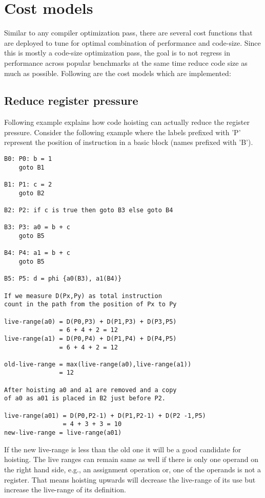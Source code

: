 \documentclass{sig-alternate}
\begin{document}
\section{Cost models}
\label{sec:cost-models}
Similar to any compiler optimization pass, there are several cost functions that
are deployed to tune for optimal combination of performance and code-size.
Since this is mostly a code-size optimization pass, the goal is to not regress
in performance across popular benchmarks at the same time reduce code size as
much as possible. Following are the cost models which are implemented:

\subsection{Reduce register pressure}
\label{hoist:reg-pressure}
Following example explains how code hoisting can actually reduce the register
pressure.  Consider the following example where the labels prefixed with 'P'
represent the position of instruction in a basic block (names prefixed with 'B').

\begin{verbatim}
B0: P0: b = 1
    goto B1

B1: P1: c = 2
    goto B2

B2: P2: if c is true then goto B3 else goto B4

B3: P3: a0 = b + c
    goto B5

B4: P4: a1 = b + c
    goto B5

B5: P5: d = phi {a0(B3), a1(B4)}

If we measure D(Px,Py) as total instruction
count in the path from the position of Px to Py

live-range(a0) = D(P0,P3) + D(P1,P3) + D(P3,P5)
               = 6 + 4 + 2 = 12
live-range(a1) = D(P0,P4) + D(P1,P4) + D(P4,P5)
               = 6 + 4 + 2 = 12

old-live-range = max(live-range(a0),live-range(a1))
               = 12

After hoisting a0 and a1 are removed and a copy
of a0 as a01 is placed in B2 just before P2.

live-range(a01) = D(P0,P2-1) + D(P1,P2-1) + D(P2 -1,P5)
                = 4 + 3 + 3 = 10
new-live-range = live-range(a01)
\end{verbatim}

If the new live-range is less than the old one it will be a good candidate for
hoisting. The live ranges can remain same as well if there is only one operand
on the right hand side, e.g., an assignment operation or, one of the operands is
not a register. That means hoisting upwards will decrease the live-range of its
use but increase the live-range of its definition.
\end{document}

